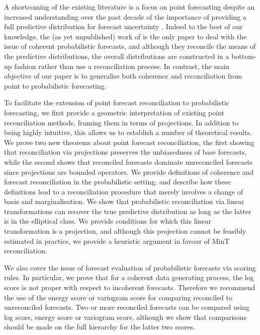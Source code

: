 \documentclass[a4paper, 11pt]{article}
\theoremstyle{definition}
\begin{document}
A shortcoming of the existing literature is a focus on point forecasting despite an increased understanding over the past decade of the importance of providing a full predictive distribution for forecast uncertainty \citep[see][and references therein]{Gneiting2014}. Indeed to the best of our knowledge, the (as yet unpublished) work of \citep{BenTaieb2017} is the only paper to deal with the issue of coherent probabilistic forecasts, and although they reconcile the means of the predictive distributions, the overall distributions are constructed in a bottom-up fashion rather than use a reconciliation process. In contrast, the main objective of our paper is to generalise both coherence and reconciliation from point to probabilistic forecasting.

To facilitate the extension of point forecast reconciliation to probabilistic forecasting, we first provide a geometric interpretation of existing point reconciliation methods, framing them in terms of projections. In addition to being highly intuitive, this allows us to establish a number of theoretical results. We prove two new theorems about point forecast reconciliation, the first showing that reconciliation via projections preserves the unbiasedness of base forecasts, while the second shows that reconciled forecasts dominate unreconciled forecasts since projections are bounded operators. We provide definitions of coherence and forecast reconciliation in the probabilistic setting, and describe how these definitions lead to a reconciliation procedure that merely involves a change of basis and marginalisation. We show that probabilistic reconciliation via linear transformations can recover the true predictive distribution as long as the latter is in the elliptical class. We provide conditions for which this linear transformation is a projection, and although this projection cannot be feasibly estimated in practice, we provide a heuristic argument in favour of MinT reconciliation.

We also cover the issue of forecast evaluation of probabilistic forecasts via scoring rules. In particular, we prove that for a coherent data generating process, the log score is not proper with respect to incoherent forecasts. Therefore we recommend the use of the energy score or variogram score for comparing reconciled to unreconciled forecasts. Two or more reconciled forecasts can be compared using log score, energy score or variogram score, although we show that comparisons should be made on the full hierarchy for the latter two scores.
\end{document}
